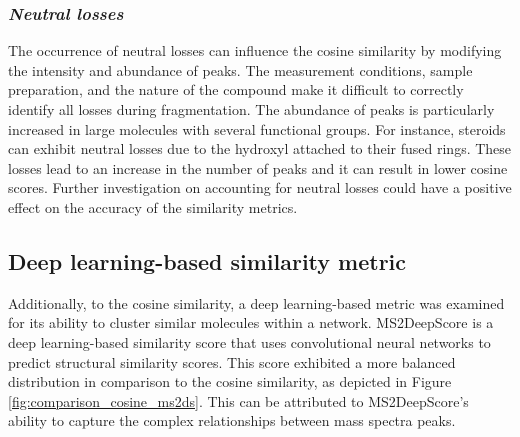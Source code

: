 \subsubsection*{\textit{Neutral losses}}
The occurrence of neutral losses can influence the cosine similarity by modifying the intensity and abundance of peaks. The measurement conditions, sample preparation, and the nature of the compound make it difficult to correctly identify all losses during fragmentation. The abundance of peaks is particularly increased in large molecules with several functional groups. For instance, steroids can exhibit neutral losses due to the hydroxyl attached to their fused rings. These losses lead to an increase in the number of peaks and it can result in lower cosine scores. Further investigation on accounting for neutral losses could have a positive effect on the accuracy of the similarity metrics.



\subsection*{Deep learning-based similarity metric}

Additionally, to the cosine similarity, a deep learning-based metric was examined for its ability to cluster similar molecules within a network. MS2DeepScore \cite{huber_MS2deepscore_2021} is a deep learning-based similarity score that uses convolutional neural networks to predict structural similarity scores. This score exhibited a more balanced distribution in comparison to the cosine similarity, as depicted in Figure \ref{fig:comparison_cosine_ms2ds}. This can be attributed to MS2DeepScore's ability to capture the complex relationships between mass spectra peaks.

